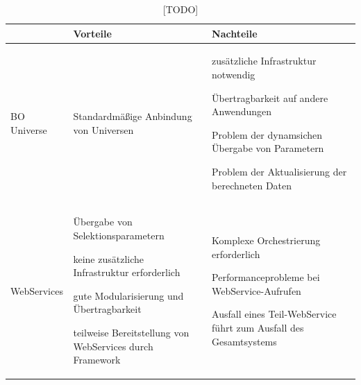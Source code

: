 {
\setlength{\extrarowheight}{2pt}
\begin{table}[htbp]
\centering
\begin{tabular}{| l | >{\centering\arraybackslash} m{5cm} | >{\centering\arraybackslash} m{5cm} |}
\cline{2-3}
\multicolumn{1}{l|}{}	& Vorteile & Nachteile \\	\hline
BO Universe 				&


\begin{seList}
\item Standardmäßige Anbindung von Universen
\end{seList}

&


\begin{seList}
\item zusätzliche Infrastruktur notwendig
\item Übertragbarkeit auf andere Anwendungen
\item Problem der dynamsichen Übergabe von Parametern
\item Problem der Aktualisierung der berechneten Daten
\end{seList}


\\	\hline
WebServices 			& 

\begin{seList}
\item Übergabe von Selektionsparametern
\item keine zusätzliche Infrastruktur erforderlich
\item gute Modularisierung und Übertragbarkeit
\item teilweise Bereitstellung von WebServices durch Framework
\end{seList}

& 


\begin{seList}
\item Komplexe Orchestrierung erforderlich
\item Performanceprobleme bei WebService-Aufrufen
\item Ausfall eines Teil-WebService führt zum Ausfall des Gesamtsystems
\end{seList}

\\	\hline
\end{tabular} 
\caption{[TODO] \label{table:vergleich_umsetzung}}
\end{table}
}

